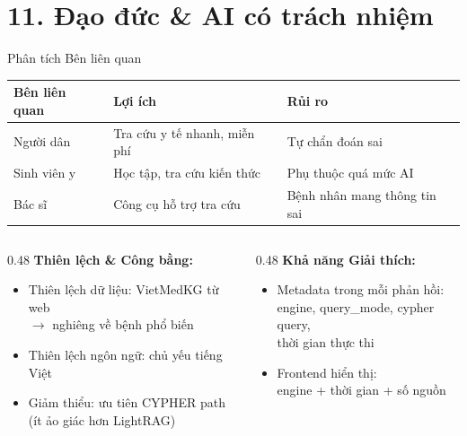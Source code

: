 \documentclass[aspectratio=169, 11pt]{beamer}
\begin{document}
\section{11. Đạo đức \& AI có trách nhiệm}

\begin{frame}{Phân tích Bên liên quan}
  \begin{center}
  \begin{tabular}{lll}
    \toprule
    \textbf{Bên liên quan} & \textbf{Lợi ích} & \textbf{Rủi ro}\\
    \midrule
    Người dân & Tra cứu y tế nhanh, miễn phí & Tự chẩn đoán sai\\
    Sinh viên y & Học tập, tra cứu kiến thức & Phụ thuộc quá mức AI\\
    Bác sĩ & Công cụ hỗ trợ tra cứu & Bệnh nhân mang thông tin sai\\
    \bottomrule
  \end{tabular}
  \end{center}
  \vspace{0.5em}
  \begin{columns}[t]
    \begin{column}{0.48\textwidth}
      \textbf{Thiên lệch \& Công bằng:}
      \begin{itemize}
        \scriptsize
        \item Thiên lệch dữ liệu: VietMedKG từ web\\
          $\to$ nghiêng về bệnh phổ biến
        \item Thiên lệch ngôn ngữ: chủ yếu tiếng Việt
        \item Giảm thiểu: ưu tiên CYPHER path\\
          (ít ảo giác hơn LightRAG)
      \end{itemize}
    \end{column}
    \begin{column}{0.48\textwidth}
      \textbf{Khả năng Giải thích:}
      \begin{itemize}
        \scriptsize
        \item Metadata trong mỗi phản hồi:\\
          engine, query\_mode, cypher query,\\
          thời gian thực thi
        \item Frontend hiển thị:\\
          engine + thời gian + số nguồn
      \end{itemize}
    \end{column}
  \end{columns}
\end{frame}
\end{document}
